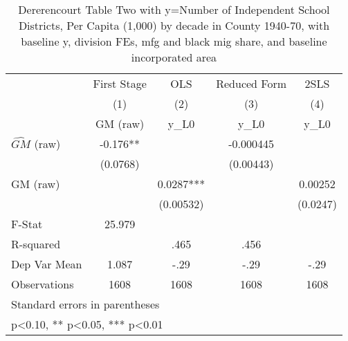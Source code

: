 \begin{table}[htbp]\centering
\def\sym#1{\ifmmode^{#1}\else\(^{#1}\)\fi}
\caption{Dererencourt Table Two with y=Number of Independent School Districts, Per Capita (1,000) by decade in County 1940-70, with baseline y, division FEs, mfg and black mig share, and baseline incorporated area}
\begin{tabular}{l*{4}{c}}
\toprule
                    & First Stage   &         OLS   &Reduced Form   &        2SLS   \\
                    &\multicolumn{1}{c}{(1)}&\multicolumn{1}{c}{(2)}&\multicolumn{1}{c}{(3)}&\multicolumn{1}{c}{(4)}\\
                    &\multicolumn{1}{c}{GM  (raw)}&\multicolumn{1}{c}{y\_L0}&\multicolumn{1}{c}{y\_L0}&\multicolumn{1}{c}{y\_L0}\\
\midrule
$\hat{GM}$ (raw)    &      -0.176** &               &   -0.000445   &               \\
                    &    (0.0768)   &               &   (0.00443)   &               \\
\addlinespace
GM  (raw)           &               &      0.0287***&               &     0.00252   \\
                    &               &   (0.00532)   &               &    (0.0247)   \\
\midrule
F-Stat              &      25.979   &               &               &               \\
R-squared           &               &        .465   &        .456   &               \\
Dep Var Mean        &       1.087   &        -.29   &        -.29   &        -.29   \\
Observations        &        1608   &        1608   &        1608   &        1608   \\
\bottomrule
\multicolumn{5}{l}{\footnotesize Standard errors in parentheses}\\
\multicolumn{5}{l}{\footnotesize * p<0.10, ** p<0.05, *** p<0.01}\\
\end{tabular}
\end{table}
